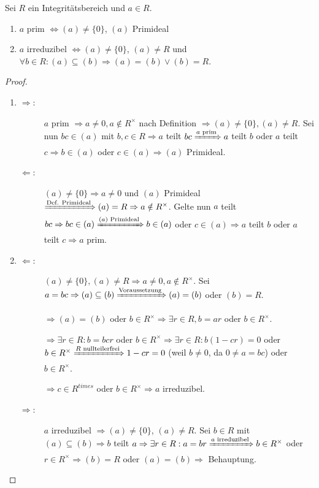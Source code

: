 \documentclass[12pt,a4paper]{scrartcl}
\begin{document}
\begin{lem} \label{lem:primired}
	Sei $R$ ein Integritätsbereich und $a\in R$.
	\begin{enumerate}
		\item $a$ prim $\Longleftrightarrow (a) \neq\{0\}$, $(a)$ Primideal
		\item $a$ irreduzibel $\Longleftrightarrow (a)\neq\{0\}$, $(a)\neq R$ und $\forall b\in R: (a) \subseteq (b)\Rightarrow (a) = (b) \vee (b) = R$.
	\end{enumerate}
\end{lem}
\begin{proof}%
	\leavevmode
	\begin{enumerate}
	\item 
	\begin{description}
		\item[\glqq$\Rightarrow$\grqq:] $a$ prim $\Rightarrow a\neq 0, a\notin R^{\times}$ nach Definition $\Rightarrow (a)\neq \{0\}, (a) \neq R$. Sei nun $bc\in (a)$ mit $b,c\in R\Rightarrow a$ teilt $bc \xRightarrow{a\text{ prim}} a$ teilt $b$ oder $a$ teilt $c\Rightarrow b\in (a)$ oder $c\in (a)\Rightarrow (a)$ Primideal.
		\item[\glqq$\Leftarrow$\grqq:] $(a) \neq \{0\}\Rightarrow a\neq 0$ und $(a)$ Primideal $\xRightarrow{\text{Def. Primideal}} (a) = R\Rightarrow a\notin R^{\times}$. Gelte nun $a$ teilt $bc\Rightarrow bc\in (a)\xRightarrow{(a)\text{ Primideal}} b\in (a)$ oder $c\in (a)\Rightarrow a$ teilt $b$ oder $a$ teilt $c\Rightarrow a$ prim.
	\end{description}
	\item
	\begin{description}
		\item[\glqq$\Leftarrow$\grqq:] $(a) \neq\{0\}, (a) \neq R\Rightarrow a\neq 0, a\notin R^{\times}$. Sei $a = bc\Rightarrow (a)\subseteq (b)\xRightarrow{\text{Voraussetzung}} (a) = (b)$ oder $(b) = R$.
		
		$\Rightarrow (a)  = (b)$ oder $b\in R^{\times} \Rightarrow\exists r\in R, b = ar$ oder $b\in R^{\times}$.
		
		$\Rightarrow \exists r\in R: b = bcr$ oder $b\in R^{\times} \Rightarrow \exists r\in R: b(1-cr) = 0$ oder $b\in R^{\times}\xRightarrow{R\text{ nullteilerfrei}} 1-cr = 0$ (weil $b\neq 0$, da $0\neq a = bc$) oder $b\in R^{\times}$.
		
		$\Rightarrow c\in R^{times}$ oder $b\in R^{\times}\Rightarrow a$ irreduzibel.

		\item[\glqq$\Rightarrow$\grqq:] $a$ irreduzibel $\Rightarrow (a) \neq \{0\}$, $(a)\neq R$. Sei $b\in R$ mit $(a) \subseteq (b)\Rightarrow b$ teilt $a\Rightarrow \exists r\in R: a = br\xRightarrow{a\text{ irreduzibel}} b\in R^{\times}$ oder $r\in R^{\times}\Rightarrow (b) = R$ oder $(a) = (b) \Rightarrow $ Behauptung.
	\end{description}
\end{enumerate}
\end{proof}
\end{document}
